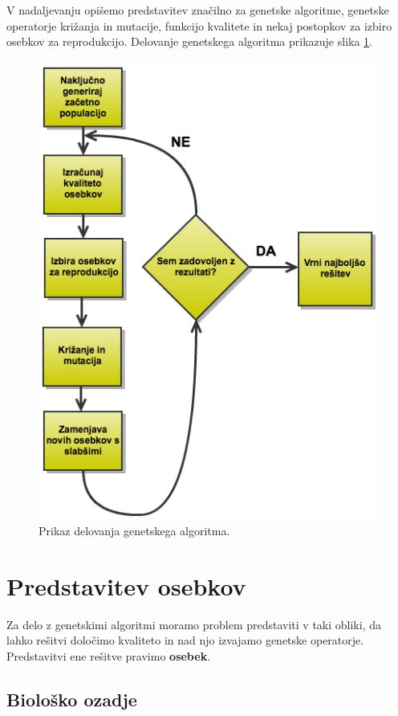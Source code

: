\documentclass[a4paper, 12pt]{book}
\begin{document}
V nadaljevanju opi\v semo predstavitev zna\v cilno za genetske algoritme, genetske operatorje kri\v zanja in mutacije, funkcijo kvalitete in nekaj postopkov za izbiro osebkov za reprodukcijo.
Delovanje genetskega algoritma prikazuje slika \ref{fig:izvajanje_ga}.
\begin{figure}
\begin{center}
\includegraphics[scale=0.70]{izvajanje_ga.png}
\end{center}
\caption{Prikaz delovanja genetskega algoritma.}
\label{fig:izvajanje_ga}
\end{figure}

\section{Predstavitev osebkov}
\label{seq:predstavitev osebkov}
Za delo z genetskimi algoritmi moramo problem predstaviti v taki obliki, da lahko re\v sitvi dolo\v cimo kvaliteto in nad njo izvajamo genetske operatorje.
Predstavitvi ene re\v sitve pravimo \textbf{osebek}.

\subsection{Biolo\v sko ozadje}
\end{document}
